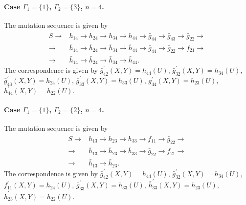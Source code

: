 \paragraph{Case $\Gamma_1 = \{1\}$, $\Gamma_2 = \{3\}$, $n=4$.} The mutation sequence is given by
\begin{equation}
    \begin{split}
S \rightarrow &\bar{h}_{14} \rightarrow \bar{h}_{24} \rightarrow \bar{h}_{34} \rightarrow \bar{h}_{44} \rightarrow \bar{g}_{44} \rightarrow \bar{g}_{43}  \rightarrow \bar{g}_{22} \rightarrow\\ \rightarrow &\bar{h}_{14} \rightarrow \bar{h}_{24} \rightarrow \bar{h}_{34} \rightarrow \bar{h}_{44} \rightarrow \bar{g}_{44} \rightarrow \bar{g}_{22} \rightarrow f_{21} \rightarrow \\ \rightarrow & \bar{h}_{14} \rightarrow \bar{h}_{24} \rightarrow \bar{h}_{34} \rightarrow \bar{h}_{44}.
\end{split}
\end{equation}
The correspondence is given by $\bar{g}_{42}^{\prime}(X,Y) = h_{44}(U)$, $\bar{g}_{32}^{\prime}(X,Y) = h_{34}(U)$, $\bar{g}_{43}^{\prime}(X,Y) = h_{24}(U)$, $\bar{g}_{33}^{\prime}(X,Y) = h_{33}(U)$, $g_{44}^{\prime}(X,Y) = h_{23}(U)$, $h_{44}^{\prime}(X,Y) = h_{22}(U)$.

\paragraph{Case $\Gamma_1 = \{1\}$, $\Gamma_2 = \{2\}$, $n=4$.} The mutation sequence is given by
\begin{equation}
    \begin{split}
S \rightarrow &\bar{h}_{13} \rightarrow \bar{h}_{23} \rightarrow \bar{h}_{33} \rightarrow f_{11} \rightarrow \bar{g}_{22}\rightarrow \\ \rightarrow &\bar{h}_{13} \rightarrow \bar{h}_{23} \rightarrow \bar{h}_{33} \rightarrow \bar{g}_{22}\rightarrow f_{21}\rightarrow\\ \rightarrow &\bar{h}_{13} \rightarrow \bar{h}_{23}.
\end{split}
\end{equation}
The correspondence is given by $\bar{g}_{42}^{\prime}(X,Y) = h_{44}(U)$, $\bar{g}_{32}^{\prime}(X,Y) = h_{34}(U)$, $f_{11}^{\prime}(X,Y) = h_{24}(U)$, $\bar{g}_{33}^{\prime}(X,Y) = h_{33}(U)$, $\bar{h}_{33}^{\prime}(X,Y) = h_{23}(U)$, $\bar{h}_{23}^{\prime}(X,Y) = h_{22}(U)$.


